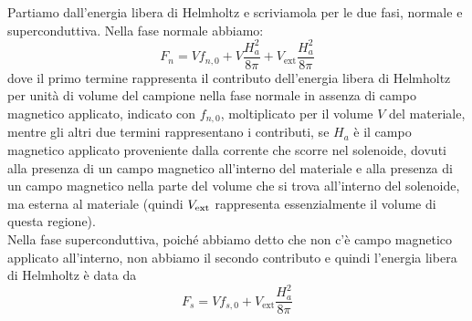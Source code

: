 \hspace{-0.6cm}Partiamo dall'energia libera di Helmholtz e scriviamola per le due fasi, normale e superconduttiva. Nella fase normale abbiamo:
\begin{equation*}
   F_n=
   V f_{n,0} + V \frac{H_a^2}{8\pi} + V_{\text{ext}} \frac{H_a^2}{8\pi}
\end{equation*}
dove il primo termine rappresenta il contributo dell'energia libera di Helmholtz per unità di volume del campione nella fase normale in assenza di campo magnetico applicato, indicato con $f_{n,0}$, moltiplicato per il volume $V$ del materiale, mentre gli altri due termini rappresentano i contributi, se $H_a$ è il campo magnetico applicato proveniente dalla corrente che scorre nel solenoide, dovuti alla presenza di un campo magnetico all'interno del materiale e alla presenza di un campo magnetico nella parte del volume che si trova all'interno del solenoide, ma esterna al materiale (quindi $V_{\rm ext}$ rappresenta essenzialmente il volume di questa regione).\\  
Nella fase superconduttiva, poiché abbiamo detto che non c'è campo magnetico applicato all'interno, non abbiamo il secondo contributo e quindi l'energia libera di Helmholtz è data da
\begin{equation*}
   F_s=
   V f_{s,0} + V_{\text{ext}} \frac{H_a^2}{8\pi}
\end{equation*}
